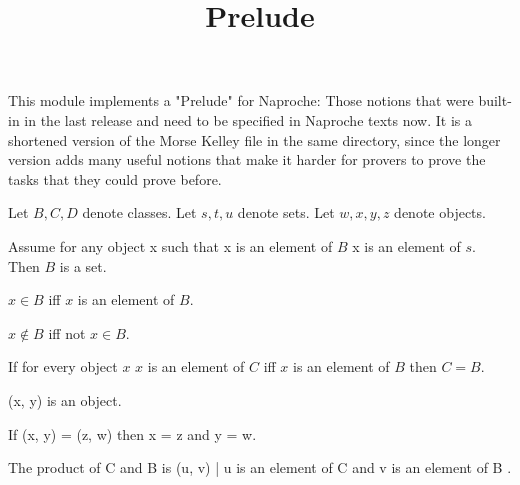 \documentclass{article}
\title{Prelude}
\author{}
\date{}
\begin{document}

  \maketitle

  This module implements a "Prelude" for Naproche: Those notions that were built-in
  in the last release and need to be specified in Naproche texts now.
  It is a shortened version of the Morse Kelley file in the same directory,
  since the longer version adds many useful notions that make it harder
  for provers to prove the tasks that they could prove before.

  \begin{forthel}

    Let $B, C, D$ denote classes.
    Let $s, t, u$ denote sets.
    Let $w, x, y, z$ denote objects.

    \begin{axiom}[SubclassOfSet]
      Assume for any object x such that x is an element of $B$ x is an element of $s$. Then $B$ is a set.
    \end{axiom}

    \begin{definition}
      $x \in B$ iff $x$ is an element of $B$.
    \end{definition}

    \begin{definition}
      $x \notin B$ iff not $x \in B$.
    \end{definition}

    \begin{axiom}[Ext]
      If for every object $x$ $x$ is an element of $C$ iff $x$ is an element of $B$ then $C = B$.
    \end{axiom}

    \begin{signature}
      (x, y) is an object.
    \end{signature}

    \begin{axiom}[OrdPair]
      If (x, y) = (z, w) then x = z and y = w.
    \end{axiom}

    \begin{definition}
      The product of C and B is { (u, v) | u is an element of C and v is an element of B }.
    \end{definition}


\end{forthel}
\end{document}
